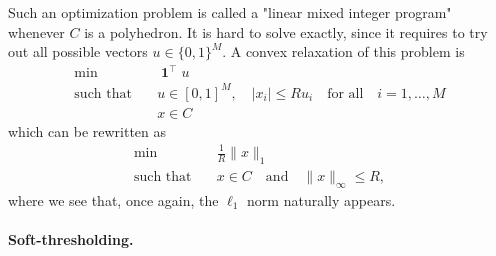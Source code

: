 \documentclass[
	fontsize=11pt, %
	twoside=false, %
	numbers=noenddot, %
]{kaobook}
\DeclareMathOperator{\bone}{\boldsymbol 1}
\newcommand{\norm}[1]{\| #1 \|}
\begin{document}
Such an optimization problem is called a "linear mixed integer program" whenever $C$ is a polyhedron. 
It is hard to solve exactly, since it requires to try out all possible vectors $u \in \{ 0, 1 \}^M$.
A convex relaxation of this problem is
\begin{align*}
	\min \quad &\bone^\top u \\ 
	\text{such that} \quad &u \in [0, 1]^M, \quad |x_i| \leq R u_i 
	\quad \text{for all} \quad i=1, \ldots, M \\
	&x \in C
\end{align*}
which can be rewritten as
\begin{align*}
	\min \quad &\frac 1R \norm{x}_1 \\ 
	\text{such that} \quad &x \in C \quad \text{and} \quad \norm{x}_\infty 
	\leq R,
\end{align*}
where we see that, once again, the $\ell_1$ norm naturally appears.


\paragraph{Soft-thresholding.}
\end{document}

